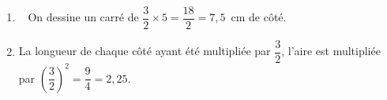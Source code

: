 
\begin{enumerate}
\item ~%
On dessine un carré de $\dfrac{3}{2} \times 5 = \dfrac{18}{2} = 7,5$~cm de côté.
\item %

La longueur de chaque côté ayant été multipliée par $\dfrac{3}{2}$, l'aire est multipliée par $\left(\dfrac{3}{2}\right)^2 = \dfrac{9}{4} = 2,25$.
\end{enumerate}